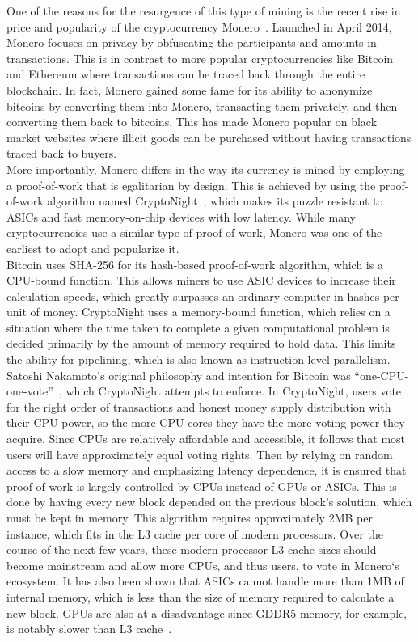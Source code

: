 One of the reasons for the resurgence of this type of mining is the recent rise in price and popularity of the cryptocurrency Monero~\cite{monero}. Launched in April 2014, Monero focuses on privacy by obfuscating the participants and amounts in transactions. This is in contrast to more popular cryptocurrencies like Bitcoin and Ethereum where transactions can be traced back through the entire blockchain. In fact, Monero gained some fame for its ability to anonymize bitcoins by converting them into Monero, transacting them privately, and then converting them back to bitcoins. This has made Monero popular on black market websites where illicit goods can be purchased without having transactions traced back to buyers. 
\\
More importantly, Monero differs in the way its currency is mined by employing a proof-of-work that is egalitarian by design. This is achieved by using the proof-of-work algorithm named CryptoNight~\cite{cryptoknight}, which makes its puzzle resistant to ASICs and fast memory-on-chip devices with low latency. While many cryptocurrencies use a similar type of proof-of-work, Monero was one of the earliest to adopt and popularize it. 
\\
Bitcoin uses SHA-256 for its hash-based proof-of-work algorithm, which is a CPU-bound function. This allows miners to use ASIC devices to increase their calculation speeds, which greatly surpasses an ordinary computer in hashes per unit of money. CryptoNight uses a memory-bound function, which relies on a situation where the time taken to complete a given computational problem is decided primarily by the amount of memory required to hold data. This limits the ability for pipelining, which is also known as instruction-level parallelism.  
\\
Satoshi Nakamoto’s original philosophy and intention for Bitcoin was “one-CPU-one-vote”~\cite{nakamoto2008bitcoin}, which CryptoNight attempts to enforce. In CryptoNight, users vote for the right order of transactions and honest money supply distribution with their CPU power, so the more CPU cores they have the more voting power they acquire. Since CPUs are relatively affordable and accessible, it follows that most users will have approximately equal voting rights. Then by relying on random access to a slow memory and emphasizing latency dependence, it is ensured that proof-of-work is largely controlled by CPUs instead of GPUs or ASICs. This is done by having every new block depended on the previous block’s solution, which must be kept in memory. This algorithm requires approximately 2MB per instance, which fits in the L3 cache per core of modern processors. Over the course of the next few years, these modern processor L3 cache sizes should become mainstream and allow more CPUs, and thus users, to vote in Monero`s ecosystem. It has also been shown that ASICs cannot handle more than 1MB of internal memory, which is less than the size of memory required to calculate a new block. GPUs are also at a disadvantage since GDDR5 memory, for example, is notably slower than L3 cache~\cite{van2013cryptonote}.  

